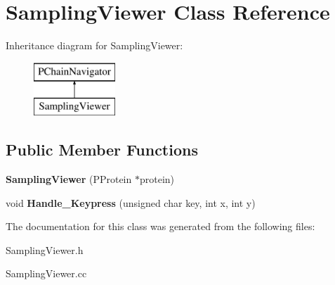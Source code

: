 \hypertarget{classSamplingViewer}{\section{Sampling\-Viewer Class Reference}
\label{classSamplingViewer}
}
Inheritance diagram for Sampling\-Viewer\-:\begin{figure}[H]
\begin{center}
\leavevmode
\includegraphics[height=2.000000cm]{classSamplingViewer}
\end{center}
\end{figure}
\subsection*{Public Member Functions}
\begin{DoxyCompactItemize}
\item 
\hypertarget{classSamplingViewer_a557d994ef89977c408eacfefb11c465b}{{\bfseries Sampling\-Viewer} (P\-Protein $\ast$protein)}\label{classSamplingViewer_a557d994ef89977c408eacfefb11c465b}

\item 
\hypertarget{classSamplingViewer_a8dea7977d6fcad5f9e92b0746f3394d5}{void {\bfseries Handle\-\_\-\-Keypress} (unsigned char key, int x, int y)}\label{classSamplingViewer_a8dea7977d6fcad5f9e92b0746f3394d5}

\end{DoxyCompactItemize}


The documentation for this class was generated from the following files\-:\begin{DoxyCompactItemize}
\item 
Sampling\-Viewer.\-h\item 
Sampling\-Viewer.\-cc\end{DoxyCompactItemize}

